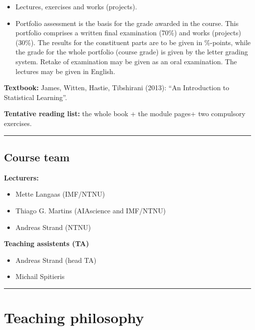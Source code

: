 \documentclass[]{article}
\providecommand{\tightlist}{%
  \setlength{\itemsep}{0pt}\setlength{\parskip}{0pt}}
\begin{document}
\begin{itemize}
\tightlist
\item
  Lectures, exercises and works (projects).
\item
  Portfolio assessment is the basis for the grade awarded in the course.
  This portfolio comprises a written final examination (70\%) and works
  (projects) (30\%). The results for the constituent parts are to be
  given in \%-points, while the grade for the whole portfolio (course
  grade) is given by the letter grading system. Retake of examination
  may be given as an oral examination. The lectures may be given in
  English.
\end{itemize}

\textbf{Textbook:} James, Witten, Hastie, Tibshirani (2013): ``An
Introduction to Statistical Learning''.

\textbf{Tentative reading list:} the whole book + the module pages+ two
compulsory exercises.

\begin{center}\rule{0.5\linewidth}{\linethickness}\end{center}

\hypertarget{course-team}{%
\subsection{Course team}\label{course-team}}

\textbf{Lecturers:}

\begin{itemize}
\tightlist
\item
  Mette Langaas (IMF/NTNU)
\item
  Thiago G. Martins (AIAscience and IMF/NTNU)
\item
  Andreas Strand (NTNU)
\end{itemize}

\textbf{Teaching assistents (TA)}

\begin{itemize}
\tightlist
\item
  Andreas Strand (head TA)
\item
  Michail Spitieris
\end{itemize}

\begin{center}\rule{0.5\linewidth}{\linethickness}\end{center}

\hypertarget{teaching-philosophy}{%
\section{Teaching philosophy}\label{teaching-philosophy}}
\end{document}
